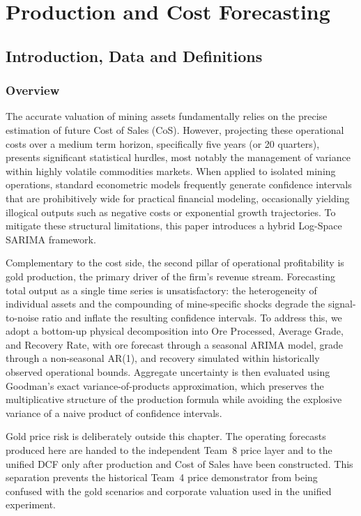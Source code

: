 \chapter{Production and Cost Forecasting}
\sourceassetnote
\section{Introduction, Data and Definitions}
\subsection{Overview}
The accurate valuation of mining assets fundamentally relies on the precise estimation of future Cost of Sales (CoS). However, projecting these operational costs over a medium term horizon, specifically five years (or 20 quarters), presents significant statistical hurdles, most notably the management of variance within highly volatile commodities markets. When applied to isolated mining operations, standard econometric models frequently generate confidence intervals that are prohibitively wide for practical financial modeling, occasionally yielding illogical outputs such as negative costs or exponential growth trajectories. To mitigate these structural limitations, this paper introduces a hybrid Log-Space SARIMA framework.

Complementary to the cost side, the second pillar of operational profitability is gold production, the primary driver of the firm's revenue stream. Forecasting total output as a single time series is unsatisfactory: the heterogeneity of individual assets and the compounding of mine-specific shocks degrade the signal-to-noise ratio and inflate the resulting confidence intervals. To address this, we adopt a bottom-up physical decomposition into Ore Processed, Average Grade, and Recovery Rate, with ore forecast through a seasonal ARIMA model, grade through a non-seasonal AR(1), and recovery simulated within historically observed operational bounds. Aggregate uncertainty is then evaluated using Goodman's exact variance-of-products approximation, which preserves the multiplicative structure of the production formula while avoiding the explosive variance of a naive product of confidence intervals.

Gold price risk is deliberately outside this chapter. The operating forecasts produced here are handed to the independent Team~8 price layer and to the unified DCF only after production and Cost of Sales have been constructed. This separation prevents the historical Team~4 price demonstrator from being confused with the gold scenarios and corporate valuation used in the unified experiment.
